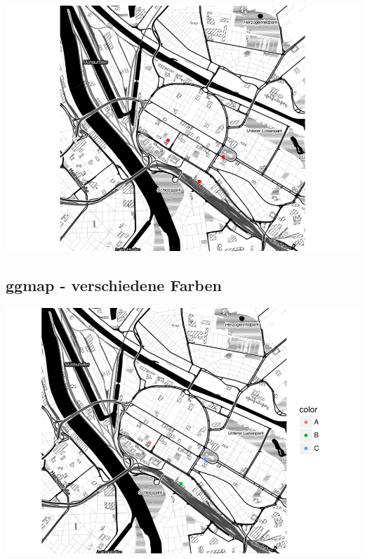 \documentclass[]{article}
\newenvironment{Shaded}{\begin{snugshade}}{\end{snugshade}}
\newcommand{\KeywordTok}[1]{\textcolor[rgb]{0.13,0.29,0.53}{\textbf{{#1}}}}
\newcommand{\DataTypeTok}[1]{\textcolor[rgb]{0.13,0.29,0.53}{{#1}}}
\newcommand{\StringTok}[1]{\textcolor[rgb]{0.31,0.60,0.02}{{#1}}}
\newcommand{\NormalTok}[1]{{#1}}
\begin{document}
\includegraphics{Intro_Datenanalyse1_files/figure-latex/unnamed-chunk-267-1.pdf}

\subsection{ggmap - verschiedene
Farben}\label{ggmap---verschiedene-farben}

\begin{Shaded}
\end{Shaded}

\includegraphics{Intro_Datenanalyse1_files/figure-latex/unnamed-chunk-268-1.pdf}
\end{document}
